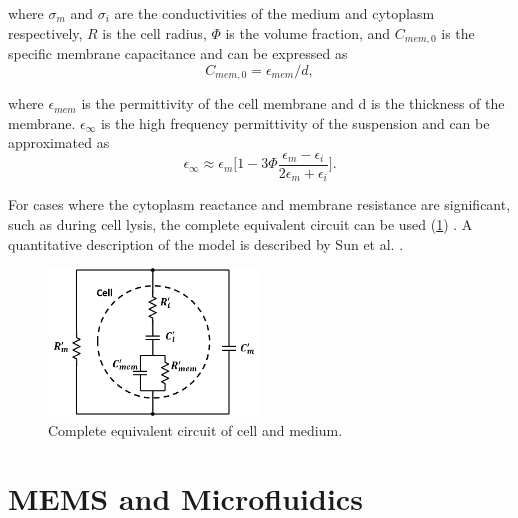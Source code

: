  \noindent where $\sigma_m$ and $\sigma_i$ are the conductivities of the medium and cytoplasm respectively, $R$ is the cell radius, $\Phi$ is the volume fraction, and $C_{mem,0}$ is the specific membrane capacitance and can be expressed as \cite{sun_single-cell_2010}
 \begin{equation}
   C_{mem,0} = \epsilon_{mem}/d,
 \end{equation}
 
 \noindent where $\epsilon_{mem}$ is the permittivity of the cell membrane and d is the thickness of the membrane. $\epsilon_\infty$ is the high frequency permittivity of the suspension and can be approximated as
 \begin{equation}
     \epsilon_\infty \approx \epsilon_m \bigg[1-3\Phi\frac{\epsilon_m-\epsilon_i}{2\epsilon_m+\epsilon_i}\bigg].
 \end{equation}
 
 \par For cases where the cytoplasm reactance and membrane resistance are significant, such as during cell lysis, the complete equivalent circuit can be used (\ref{fig:complete_equiv_circuit_cell_medium}) \cite{sun_single-cell_2010}. A quantitative description of the model is described by Sun et al. \cite{sun_dielectric_2007}.

 \begin{figure}
     \centering
     \includegraphics[width=0.5\textwidth]{images/completeCellMediumCircuit.png}
     \caption{Complete equivalent circuit of cell and medium.}
     \label{fig:complete_equiv_circuit_cell_medium}
 \end{figure}
 
 \section[MEMs and Microfluidics]{MEMS and Microfluidics}
 
